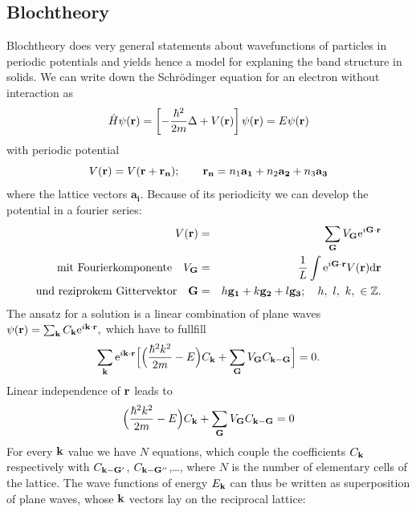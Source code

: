\subsection{Blochtheory}
Blochtheory does very general statements about wavefunctions of particles in periodic potentials and
yields hence a model for explaning the band structure in solids.
We can write down the Schrödinger equation for an electron without interaction as 
\begin{equation}
    \hat{ H} \psi(\mathbf{r}) = \left [ - \frac{\hbar^2}{2m} \Delta + V(\mathbf{r}) \right] \psi(\mathbf{r}) = E \psi(\mathbf{r})
\end{equation}
with periodic potential
\begin{equation}
    V(\mathbf{r}) = V(\mathbf{r + r_n}); 
\qquad \mathbf{r_n} = n_1 \mathbf{a_1} + n_2 \mathbf{a_2} + n_3 \mathbf{a_3} 
\end{equation}
where the lattice vectors $\mathbf{a_i}$. Because of its periodicity we can develop the
potential in a fourier series:
\begin{eqnarray}
    V(\mathbf{r}) &= &\sum_{\mathbf{G}} V_{\mathbf{G}} \mathrm{e}^{i\mathbf{G} \cdot \mathbf{r}} \\
    \mathrm{mit \ Fourierkomponente \quad}  V_{\mathbf{G}} &= &\frac{1}{L} \int \mathrm{e}^{i\mathbf{G} \cdot \mathbf{r}} 
    V(\mathbf{r}) \mathrm{d}\mathbf{r}  \nonumber \\
    \mathrm{und \ reziprokem \ Gittervektor \quad} \mathbf{G} &= &h\mathbf{g_1} + k\mathbf{g_2} +l\mathbf{g_3}; 
    \quad h, \ l, \ k, \ \in \mathbb{Z}. \nonumber
\end{eqnarray}
The ansatz for a solution is a linear combination of plane waves
$ \psi(\mathbf{r}) = \sum_{\mathbf{k}} C_{\mathbf{k}} \mathrm{e}^{i\mathbf{k} \cdot \mathbf{r}}, $
which have to fullfill
\begin{equation}
    \sum_{\mathbf{k}} \mathrm{e}^{i\mathbf{k} \cdot \mathbf{r}} 
    \Big[ \Big( \frac{\hbar^2 k^2}{2m} - E\Big) C_{\mathbf{k}} + \sum_{\mathbf{G}} V_{\mathbf{G}} C_{\mathbf{k} - \mathbf{G}}\Big] 
    = 0.
\end{equation}
Linear independence of $\mathbf{r}$ leads to
\begin{equation}
    \Big( \frac{\hbar^2 k^2}{2m} - E\Big) C_{\mathbf{k}} + \sum_{\mathbf{G}} V_{\mathbf{G}} C_{\mathbf{k} - \mathbf{G}}= 0
\end{equation}
For every $\mathbf{k}$ value we have $N$ equations, which couple the coefficients $C_{\mathbf{k}}$ respectively with 
$C_{\mathbf{k} - \mathbf{G}'}$, $C_{\mathbf{k} - \mathbf{G}''}$,\ldots, where $N$ is the number of elementary cells of the lattice.
The wave functions of energy  $E_{\mathbf{k}}$ can thus be written as superposition of plane waves, whose 
$\mathbf{k}$ vectors lay on the reciprocal lattice:

